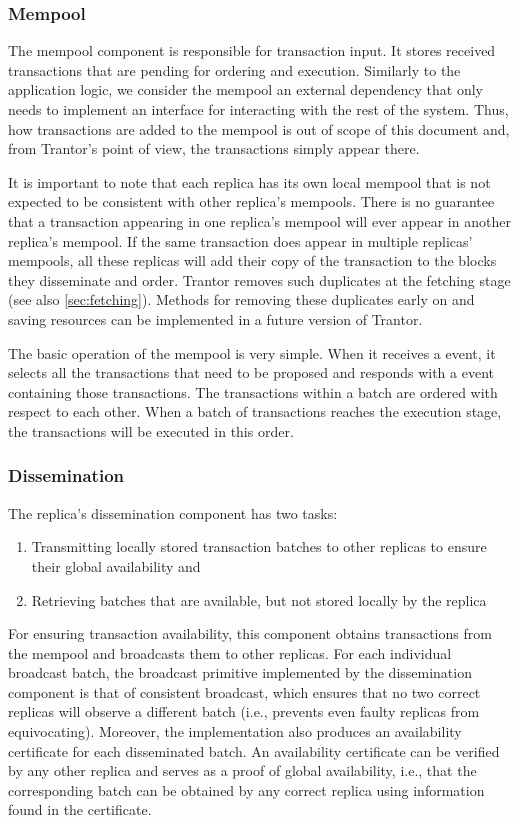 \documentclass{article}
\begin{document}
\subsubsection{Mempool}
\label{sec:mempool}

The mempool component is responsible for transaction input.
It stores received transactions that are pending for ordering and execution.
Similarly to the application logic, we consider the mempool an external dependency
that only needs to implement an interface for interacting with the rest of the system.
Thus, how transactions are added to the mempool is out of scope of this document and,
from Trantor’s point of view, the transactions simply appear there.

It is important to note that each replica has its own local mempool
that is not expected to be consistent with other replica’s mempools.
There is no guarantee that a transaction appearing in one replica’s mempool will ever appear in another replica’s mempool.
If the same transaction does appear in multiple replicas’ mempools,
all these replicas will add their copy of the transaction to the blocks they disseminate and order.
Trantor removes such duplicates at the fetching stage (see also \cref{sec:fetching}).
Methods for removing these duplicates early on and saving resources can be implemented in a future version of Trantor.

The basic operation of the mempool is very simple.
When it receives a  event,
it selects all the transactions that need to be proposed and responds with a  event containing those transactions.
The transactions within a batch are ordered with respect to each other.
When a batch of transactions reaches the execution stage, the transactions will be executed in this order.

\subsubsection{Dissemination}

The replica’s dissemination component has two tasks:
\begin{enumerate}
    \item Transmitting locally stored transaction batches to other replicas to ensure their global availability and
    \item Retrieving batches that are available, but not stored locally by the replica
\end{enumerate}


For ensuring transaction availability, this component obtains transactions from the mempool and broadcasts them to other replicas.
For each individual broadcast batch,
the broadcast primitive implemented by the dissemination component is that of consistent broadcast,
which ensures that no two correct replicas will observe a different batch
(i.e., prevents even faulty replicas from equivocating).
Moreover, the implementation also produces an availability certificate for each disseminated batch.
An availability certificate can be verified by any other replica and serves as a proof of global availability,
i.e., that the corresponding batch can be obtained by any correct replica using information found in the certificate.
\end{document}

